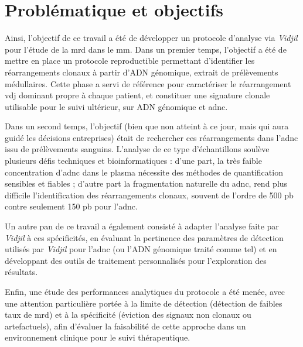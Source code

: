 \chapter{Problématique et objectifs}

Ainsi, l'objectif de ce travail a été de développer un protocole d'analyse via
\textit{Vidjil} pour l'étude de la \gls{mrd} dans le \gls{mm}. Dans un premier
temps, l'objectif a été de mettre en place un protocole reproductible
permettant d'identifier les réarrangements clonaux à partir d'ADN génomique,
extrait de prélèvements médullaires. Cette phase a servi de référence pour
caractériser le réarrangement \gls{vdj} dominant propre à chaque patient, et
constituer une signature clonale utilisable pour le suivi ultérieur, sur ADN
génomique et \gls{adnc}.

Dans un second temps, l'objectif (bien que non atteint à ce jour, mais qui aura
guidé les décisions entreprises) était de rechercher ces réarrangements dans
l'\gls{adnc} issu de prélèvements sanguins. L'analyse de ce type d'échantillons
soulève plusieurs défis techniques et bioinformatiques : d'une part, la très
faible concentration d'\gls{adnc} dans le plasma nécessite des méthodes de
quantification sensibles et fiables ; d'autre part la fragmentation naturelle
du \gls{adnc}, rend plus difficile l'identification des réarrangements clonaux,
souvent de l'ordre de 500 pb contre seulement 150 pb pour l'\gls{adnc}.

Un autre pan de ce travail a également consisté à adapter l'analyse faite par
\textit{Vidjil} à ces spécificités, en évaluant la pertinence des paramètres de
détection utilisés par \textit{Vidjil} pour l'\gls{adnc} (ou l'ADN génomique
traité comme tel) et en développant des outils de traitement personnalisés pour
l'exploration des résultats.

Enfin, une étude des performances analytiques du protocole a été menée, avec
une attention particulière portée à la limite de détection (détection de faibles taux
de \gls{mrd}) et à la spécificité (éviction des signaux non clonaux ou
artefactuels), afin d'évaluer la faisabilité de cette approche dans un
environnement clinique pour le suivi thérapeutique.

